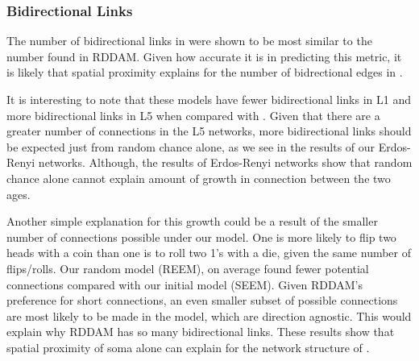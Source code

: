 \subsubsection{Bidirectional Links}
The number of bidirectional links in \ce were shown to be most similar to the number found in RDDAM.
Given how accurate it is in predicting this metric, it is likely that spatial proximity explains for the number of bidrectional edges in \ce.

It is interesting to note that these models have fewer bidirectional links in L1 and more bidirectional links in L5 when compared with \ce. 
Given that there are a greater number of connections in the L5 networks, more bidirectional links should be expected just from random chance alone, as we see in the results of our Erdos-Renyi networks. 
Although, the results of Erdos-Renyi networks show that random chance alone cannot explain amount of growth in connection between the two ages. 

Another simple explanation for this growth could be a result of the smaller number of connections possible under our model. 
One is more likely to flip two heads with a coin than one is to roll two 1's with a die, given the same number of flips/rolls. 
Our random model (REEM), on average found fewer potential connections compared with our initial model (SEEM). 
Given RDDAM's preference for short connections, an even smaller subset of possible connections are most likely to be made in the model, which are direction agnostic. 
This would explain why RDDAM has so many bidirectional links. 
These results show that spatial proximity of soma alone can explain for the network structure of \ce.